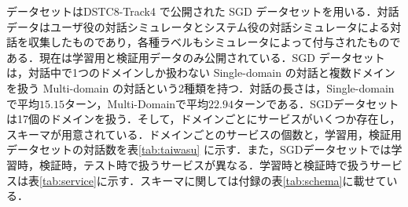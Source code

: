 データセットはDSTC8-Track4 で公開された SGD データセット\cite{sgd}を用いる．対話データはユーザ役の対話シミュレータとシステム役の対話シミュレータによる対話を収集したものであり，各種ラベルもシミュレータによって付与されたものである．現在は学習用と検証用データのみ公開されている．SGD データセットは，対話中で1つのドメインしか扱わない Single-domain の対話と複数ドメインを扱う Multi-domain の対話という2種類を持つ．対話の長さは，Single-domainで平均$15.15$ターン，Multi-Domainで平均$22.94$ターンである．SGDデータセットは17個のドメインを扱う．そして，ドメインごとにサービスがいくつか存在し，スキーマが用意されている．ドメインごとのサービスの個数と，学習用，検証用データセットの対話数を表\ref{tab:taiwasu} に示す．また，SGDデータセットでは学習時，検証時，テスト時で扱うサービスが異なる．学習時と検証時で扱うサービスは表\ref{tab:service}に示す．スキーマに関しては付録の表\ref{tab:schema}に載せている．

